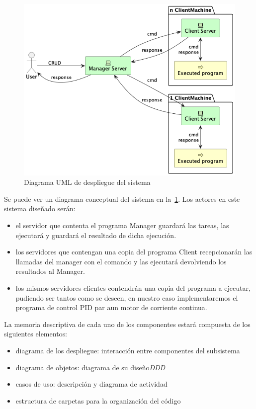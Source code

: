 \begin{figure}[H]
    \centering
    \includegraphics[height=0.4\textheight]{./part/Proyecto_ejecutivo/memoria_descriptiva/descripcionDelProyecto/manager/uml/systemConcept}
    \caption{Diagrama UML de despliegue del sistema}\label{fig:Diagrama UML de despliegue del sistema}
\end{figure}

Se puede ver un diagrama conceptual del sistema en la~\cref{fig:Diagrama UML de despliegue del sistema}. Los actores en este sistema diseñado serán:
\begin{itemize}
    \item el servidor que contenta el programa \gls{Manager} guardará las tareas, las ejecutará y guardará el resultado de dicha ejecución.
    \item los servidores que contengan una copia del programa \gls{Client} recepcionarán las llamadas del manager con el comando y las ejecutará devolviendo los resultados al Manager.
    \item los mismos servidores clientes contendrán una copia del programa a ejecutar, pudiendo ser tantos como se deseen, en nuestro caso implementaremos el programa de control PID par aun motor de corriente continua.
\end{itemize}

La memoria descriptiva de cada uno de los componentes estará compuesta de los siguientes elementos:

\begin{itemize}
    \item diagrama de los despliegue: interacción entre componentes del subsistema
    \item diagrama de objetos: diagrama de su diseño\textit{DDD}
    \item casos de uso: descripción y diagrama de actividad
    \item estructura de carpetas para la organización del código
\end{itemize}

